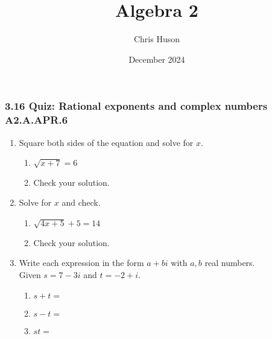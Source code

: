 \documentclass[12pt, twoside]{article}
\title{Algebra 2}
\author{Chris Huson}
\date{December 2024}
\begin{document}
\subsubsection*{3.16 Quiz: Rational exponents and complex numbers \hfill A2.A.APR.6}
\begin{enumerate}[itemsep=0.5cm]


\item Square both sides of the equation and solve for $x$.
    \begin{multicols}{2}
    \begin{enumerate}[itemsep=0.5cm]
        \item  $\sqrt{x+7}=6$
        \item Check your solution.
    \end{enumerate}
    \end{multicols} \vspace{3cm}

\item Solve for $x$ and check.
    \begin{multicols}{2}
    \begin{enumerate}[itemsep=0.5cm]
        \item  $\sqrt{4x+5} + 5 = 14$
        \item Check your solution.
    \end{enumerate}
    \end{multicols} \vspace{3cm}

\item Write each expression in the form $a+bi$ with $a,b$ real numbers. \\[0.25cm]
Given  $s = 7 - 3i $ and $t = -2 + i$.
    \begin{enumerate}[itemsep=1.5cm]
        \item $s+t =$
        \item $s-t =$
        \item $st =$
    \end{enumerate} \vspace{3cm}

\newpage

\end{enumerate}
\end{document}
